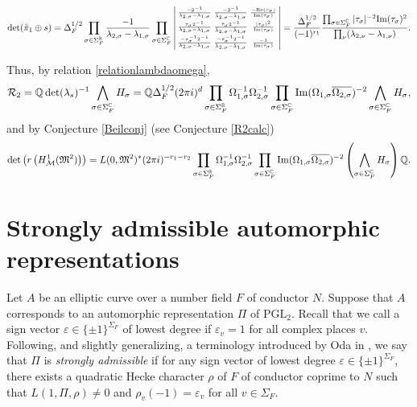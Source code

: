 \documentclass{amsart}
\theoremstyle{definition}
\theoremstyle{remark}
\numberwithin{equation}{section}
\newcommand{\PGL}{{\mathrm{PGL}}}
\newcommand{\mfM}{{\mathfrak M}}
\newcommand{\Q}{{\mathbb Q}}
\newcommand{\C}{{\mathbb C}}
\newcommand{\R}{{\mathbb R}}
\newcommand{\cR}{{\mathcal R}}
\newcommand{\cM}{{\mathcal M}}
\begin{document}
\begin{small}
\[
\det(\tilde\pi_1\oplus s)=\Delta_F^{1/2}\prod_{\sigma\in\Sigma_F^\R}\frac{-1}{\lambda_{2,\sigma}-\lambda_{1,\sigma}}\prod_{\sigma\in\Sigma_F^\C}\left|\begin{smallmatrix}
    \frac{-2^{-1}}{\lambda_{2,\sigma}-\lambda_{1,\sigma}} & \frac{-2^{-1}}{\bar\lambda_{2,\sigma}-\bar\lambda_{1,\sigma}} &\frac{-{\rm Re}(\tau_\sigma)}{{\rm Im}(\tau_\sigma)}\\
    \frac{\tau_\sigma2^{-1}}{\lambda_{2,\sigma}-\lambda_{1,\sigma}} &\frac{\bar\tau_\sigma2^{-1}}{\bar\lambda_{2,\sigma}-\bar\lambda_{1,\sigma}} &\frac{|\tau_\sigma|^2}{{\rm Im}(\tau_\sigma)}\\
    \frac{-\tau_\sigma^{-1}2^{-1}}{\lambda_{2,\sigma}-\lambda_{1,\sigma}}&\frac{-\bar\tau_\sigma^{-1}2^{-1}}{\bar\lambda_{2,\sigma}-\bar\lambda_{1,\sigma}}&\frac{-1}{{\rm Im}(\tau_\sigma)}
\end{smallmatrix}\right|=\frac{\Delta_F^{1/2}}{(-1)^{r_1}}\frac{\prod_{\sigma\in\Sigma_F^\C}|\tau_\sigma|^{-2}{\rm Im}(\tau_\sigma)^2}{\prod_{\nu}(\lambda_{2,\nu}-\lambda_{1,\nu})}.
\]
\end{small}
Thus, by relation \eqref{relationlambdaomega},
\begin{equation*}
    \cR_2=\Q\det(\lambda_s)^{-1}\bigwedge_{\sigma\in\Sigma_F^\C} H_\sigma=\Q\Delta_F^{1/2}(2\pi i)^d\prod_{\sigma\in\Sigma_F^\R}\Omega_{1,{\sigma}}^{-1}\Omega_{2,{\sigma}}^{-1}\prod_{\sigma\in\Sigma_F^\C}{\rm Im}(\Omega_{1,\sigma}\overline{\Omega_{2,\sigma}})^{-2}\bigwedge_{\sigma\in\Sigma_F^\C} H_\sigma,
\end{equation*}
and by Conjecture \ref{Beilconj} (see Conjecture \ref{R2calc})
\[
 \det\left(r\left(H^1_{\cM}(\mfM^2)\right)\right)= L(0,\mfM^2)^*(2\pi i)^{-r_1-r_2}\prod_{\sigma\in\Sigma_F^\R}\Omega_{1,{\sigma}}^{-1}\Omega_{2,{\sigma}}^{-1}\prod_{\sigma\in\Sigma_F^\C}{\rm Im}(\Omega_{1,\sigma}\overline{\Omega_{2,\sigma}})^{-2}\left(\bigwedge_{\sigma\in\Sigma_F^\C} H_\sigma\right)\Q.
\]





\section{Strongly admissible automorphic representations}\label{sec:apendix B} Let $A$ be an elliptic curve over a number field $F$ of conductor $N$. Suppose that $A$ corresponds to an automorphic representation $\Pi$ of $\PGL_2$.  Recall that we call a sign vector $\varepsilon\in\{\pm 1\}^{\Sigma_F}$ of lowest degree if $\varepsilon_v=1$ for all complex places $v$. Following, and slightly generalizing, a terminology introduced by Oda in \cite{oda83}, we say that $\Pi$ is \emph{strongly admissible} if for any sign vector of lowest degree $\varepsilon\in \{\pm 1\}^{\Sigma_F}$, there exists a quadratic Hecke character $\rho$ of $F$ of conductor coprime to $N$ such that $L(1,\Pi,\rho)\neq 0$ and $\rho_v(-1)=\varepsilon_v$ for all $v\in\Sigma_F$.
\end{document}
